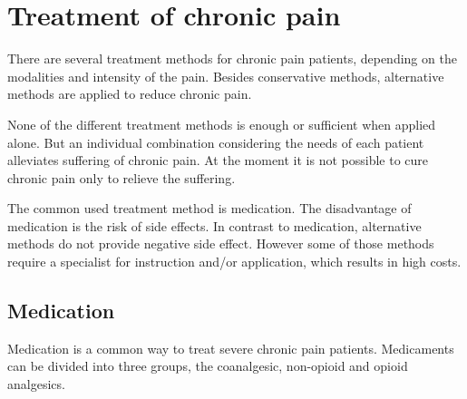 

\section{Treatment of chronic pain} \label{sec:treatment}
There are several treatment methods for chronic pain patients, depending on the modalities and intensity of the pain. Besides conservative methods, alternative methods are applied to reduce chronic pain. %
\cite{marcus2009,pope2017}

None of the different treatment methods is enough or sufficient when applied alone. But an individual combination considering the needs of each patient alleviates suffering of chronic pain. At the moment it is not possible to cure chronic pain only to relieve the suffering. \cite{marcus2009,pope2017} 

The common used treatment method is medication. The disadvantage of medication is the risk of side effects. In contrast to medication, alternative methods do not provide negative side effect. However some of those methods require a specialist for instruction and/or application, which results in high costs. \cite{marcus2009,pope2017}

\subsection{Medication}
Medication is a common way to treat severe chronic pain patients. %
Medicaments can be divided into three groups, the coanalgesic, non-opioid and opioid analgesics. \cite{marcus2009}

